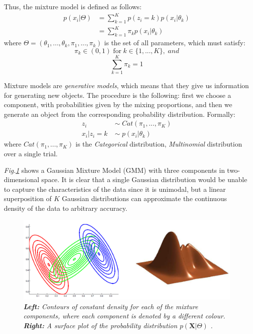 Thus, the mixture model is defined as follows:
\begin{equation} \label{mix-model-f-mm}
	\begin{aligned}
		p(x_{i}|\Theta) & = \sum_{k=1}^{K} p(z_{i} = k) p(x_{i}|\theta_{k}) \\
			& = \sum_{k=1}^{K}\pi_{k} p(x_{i}|\theta_{k})
	\end{aligned}
\end{equation}
where $\Theta = (\theta_{1},..., \theta_{k}, \pi_{1},..., \pi_{k})$ is the set of all parameters, which must satisfy:
\begin{equation}
		\pi_{k} \in (0, 1) \; \text{for} \; k \in \lbrace 1,...,K \rbrace, \; and 
\end{equation}
\begin{equation}
		\sum_{k=1}^{K}\pi_{k} = 1 
\end{equation}

Mixture models are \emph{generative models}, which means that they give us information for generating new objects. The procedure is the following: first we choose a component, with probabilities given by the mixing proportions, and then we generate an object from the corresponding probability distribution. Formally:
\begin{equation}
	\begin{aligned}
		z_{i} \; & \sim \; Cat(\pi_{1},...,\pi_{K}) \\
		x_{i} | z_{i}=k \; & \sim \; p(x_{i}|\theta_{k})
	\end{aligned}
\end{equation}
where $Cat(\pi_{1},...,\pi_{K})$ is the \emph{Categorical} distribution, \ie \emph{Multinomial} distribution over a single trial.

\emph{Fig.\ref{gmm-pic}} shows a Gaussian Mixture Model (GMM) with three components in two-dimensional space. It is clear that a single Gaussian distribution would be unable to capture the characteristics of the data since it is unimodal, but a linear superposition of $K$ Gaussian distributions can approximate the continuous density of the data to arbitrary accuracy. 

\begin{figure}[!ht]
	\begin{center}
 		\includegraphics[scale = 0.43]{images/gmm.png}
		 	  \caption{\emph{\textbf{Left:} Contours of constant density for each of the mixture components, where each component is denoted by a different colour. \textbf{Right:} A surface plot of the probability distribution $p(\mathbf{X}|\Theta)$ \cite[Ch. \ 2]{Bishop2006}.}}
		\label{gmm-pic}
	\end{center}
\end{figure}


